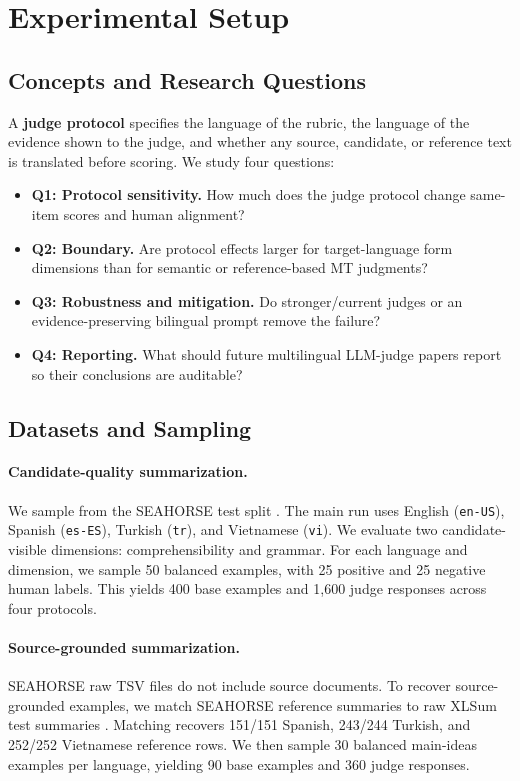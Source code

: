 \documentclass{article}
\begin{document}
\section{Experimental Setup}

\subsection{Concepts and Research Questions}

A \textbf{judge protocol} specifies the language of the rubric, the language of the evidence shown to the judge, and whether any source, candidate, or reference text is translated before scoring. We study four questions:
\begin{itemize}
    \item \textbf{Q1: Protocol sensitivity.} How much does the judge protocol change same-item scores and human alignment?
    \item \textbf{Q2: Boundary.} Are protocol effects larger for target-language form dimensions than for semantic or reference-based MT judgments?
    \item \textbf{Q3: Robustness and mitigation.} Do stronger/current judges or an evidence-preserving bilingual prompt remove the failure?
    \item \textbf{Q4: Reporting.} What should future multilingual LLM-judge papers report so their conclusions are auditable?
\end{itemize}

\subsection{Datasets and Sampling}

\paragraph{Candidate-quality summarization.}
We sample from the SEAHORSE test split \citep{clark2023seahorse}. The main run uses English (\texttt{en-US}), Spanish (\texttt{es-ES}), Turkish (\texttt{tr}), and Vietnamese (\texttt{vi}). We evaluate two candidate-visible dimensions: comprehensibility and grammar. For each language and dimension, we sample 50 balanced examples, with 25 positive and 25 negative human labels. This yields 400 base examples and 1,600 judge responses across four protocols.

\paragraph{Source-grounded summarization.}
SEAHORSE raw TSV files do not include source documents. To recover source-grounded examples, we match SEAHORSE reference summaries to raw XLSum test summaries \citep{hasan2021xlsum}. Matching recovers 151/151 Spanish, 243/244 Turkish, and 252/252 Vietnamese reference rows. We then sample 30 balanced main-ideas examples per language, yielding 90 base examples and 360 judge responses.
\end{document}
